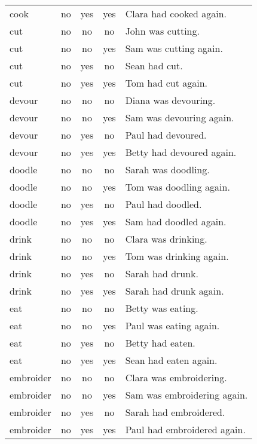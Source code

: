 \begin{longtable}{l|ccc|p{5cm}}
cook      & no   & yes  & yes  & Clara had cooked again.     \\
cut       & no   & no   & no   & John was cutting.           \\
cut       & no   & no   & yes  & Sam was cutting again.      \\
cut       & no   & yes  & no   & Sean had cut.               \\
cut       & no   & yes  & yes  & Tom had cut again.          \\
devour    & no   & no   & no   & Diana was devouring.        \\
devour    & no   & no   & yes  & Sam was devouring again.    \\
devour    & no   & yes  & no   & Paul had devoured.          \\
devour    & no   & yes  & yes  & Betty had devoured again.   \\
doodle    & no   & no   & no   & Sarah was doodling.         \\
doodle    & no   & no   & yes  & Tom was doodling again.     \\
doodle    & no   & yes  & no   & Paul had doodled.           \\
doodle    & no   & yes  & yes  & Sam had doodled again.      \\
drink     & no   & no   & no   & Clara was drinking.         \\
drink     & no   & no   & yes  & Tom was drinking again.     \\
drink     & no   & yes  & no   & Sarah had drunk.            \\
drink     & no   & yes  & yes  & Sarah had drunk again.      \\
eat       & no   & no   & no   & Betty was eating.           \\
eat       & no   & no   & yes  & Paul was eating again.      \\
eat       & no   & yes  & no   & Betty had eaten.            \\
eat       & no   & yes  & yes  & Sean had eaten again.       \\
embroider & no   & no   & no   & Clara was embroidering.     \\
embroider & no   & no   & yes  & Sam was embroidering again. \\
embroider & no   & yes  & no   & Sarah had embroidered.      \\
embroider & no   & yes  & yes  & Paul had embroidered again. \\

\end{longtable}
